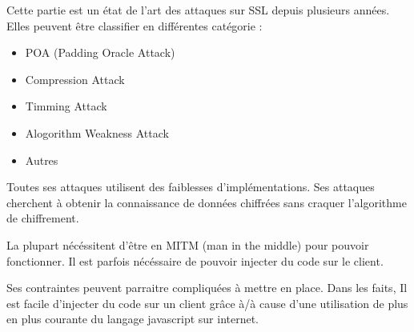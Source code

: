 Cette partie est un état de l'art des attaques sur SSL depuis plusieurs années.
Elles peuvent être classifier en différentes catégorie :

\begin{itemize}
\item POA (Padding Oracle Attack)
\item Compression Attack
\item Timming Attack
\item Alogorithm Weakness Attack
\item Autres
\end{itemize}

Toutes ses attaques utilisent des faiblesses d'implémentations.
Ses attaques cherchent à obtenir la connaissance de données chiffrées
sans craquer l'algorithme de chiffrement. 

La plupart nécéssitent d'être en MITM (man in the middle) pour pouvoir
fonctionner. Il est parfois nécéssaire de pouvoir injecter du code 
sur le client.

Ses contraintes peuvent parraitre compliquées à mettre en place.
Dans les faits, Il est facile d'injecter du code sur un client
grâce à/à cause d'une utilisation de plus en plus courante du langage
javascript sur internet.
